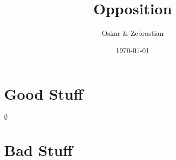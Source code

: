 \documentclass{article}
\title{Opposition}
\author{Oskar \& Zebrastian}
\begin{document}
\date{\today}
\maketitle

\section*{Good Stuff}
$\emptyset$
\section*{Bad Stuff}
\end{document}
